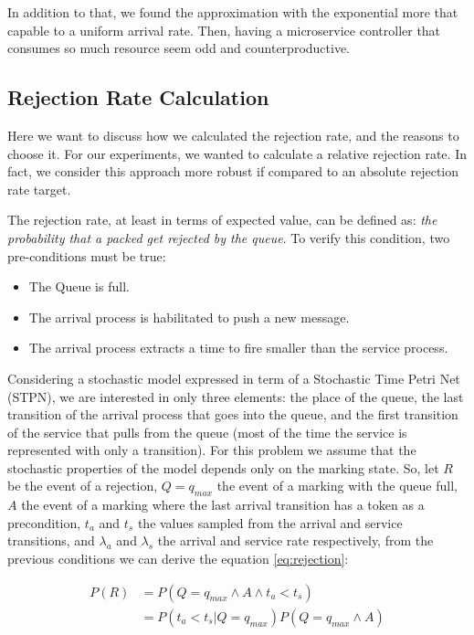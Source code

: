 In addition to that, we found the approximation with the exponential more that capable to a uniform arrival rate. Then, having a microservice controller that consumes so much resource seem odd and counterproductive.

\subsection{Rejection Rate Calculation}
Here we want to discuss how we calculated the rejection rate, and the reasons to choose it. For our experiments, we wanted to calculate a relative rejection rate. In fact, we consider this approach more robust if compared to an absolute rejection rate target.

The rejection rate, at least in terms of expected value, can be defined as: \textit{the probability that a packed get rejected by the queue}. To verify this condition, two pre-conditions must be true:
\begin{itemize}
    \item The Queue is full.
    \item The arrival process is habilitated to push a new message.
    \item The arrival process extracts a time to fire smaller than the service process.
\end{itemize}

Considering a stochastic model expressed in term of a Stochastic Time Petri Net (STPN), we are interested in only three elements: the place of the queue, the last transition of the arrival process that goes into the queue, and the first transition of the service that pulls from the queue (most of the time the service is represented with only a transition). For this problem we assume that the stochastic properties of the model depends only on the marking state. So, let $R$ be the event of a rejection, $Q=q_{max}$ the event of a marking with the queue full, $A$ the event of a marking where the last arrival transition has a token as a precondition, $t_a$ and $t_s$ the values sampled from the arrival and service transitions, and $\lambda_a$ and $\lambda_s$ the arrival and service rate respectively, from the previous conditions we can derive the equation \ref{eq:rejection}:

\begin{equation}
    \label{eq:rejection}
    \begin{split}        
    P(R)& =P(Q=q_{max} \land A\land t_a<t_s)\\
    & = P(t_a<t_s|Q=q_{max})P(Q=q_{max} \land A)
    \end{split}
\end{equation}

